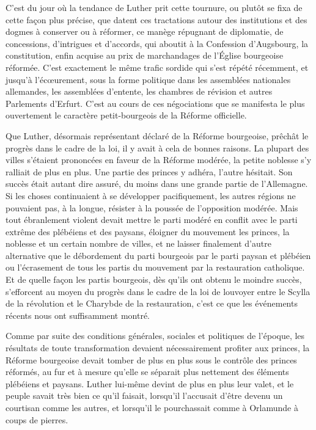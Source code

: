 \documentclass[french,twoside]{book} %
\begin{document}
\noindent C’est du jour où la tendance de Luther prit cette tournure, ou plutôt se fixa de cette façon plus précise, que datent ces tractations autour des institutions et des dogmes à conserver ou à réformer, ce manège répugnant de diplomatie, de concessions, d’intrigues et d’accords, qui aboutit à la Confession d’Augsbourg, la constitution, enfin acquise au prix de marchandages de l’Église bourgeoise réformée. C’est exactement le même trafic sordide qui s’est répété récemment, et jusqu’à l’écœurement, sous la forme politique dans les assemblées nationales allemandes, les assemblées d’entente, les chambres de révision et autres Parlements d’Erfurt. C’est au cours de ces négociations que se manifesta le plus ouvertement le caractère petit-bourgeois de la Réforme officielle.\par
Que Luther, désormais représentant déclaré de la Réforme bourgeoise, prêchât le progrès dans le cadre de la loi, il y avait à cela de bonnes raisons. La plupart des villes s’étaient prononcées en faveur de la Réforme modérée, la petite noblesse s’y ralliait de plus en plus. Une partie des princes y adhéra, l’autre hésitait. Son succès était autant dire assuré, du moins dans une grande partie de l’Allemagne. Si les choses continuaient à se développer pacifiquement, les autres régions ne pouvaient pas, à la longue, résister à la poussée de l’opposition modérée. Mais tout ébranlement violent devait mettre le parti modéré en conflit avec le parti extrême des plébéiens et des paysans, éloigner du mouvement les princes, la noblesse et un certain nombre de villes, et ne laisser finalement d’autre alternative que le débordement du parti bourgeois par le parti paysan et plébéien ou l’écrasement de tous les partis du mouvement par la restauration catholique. Et de quelle façon les partis bourgeois, dès qu’ils ont obtenu le moindre succès, s’efforcent au moyen du progrès dans le cadre de la loi de louvoyer entre le Scylla de la révolution et le Charybde de la restauration, c’est ce que les événements récents nous ont suffisamment montré.\par
Comme par suite des conditions générales, sociales et politiques de l’époque, les résultats de toute transformation devaient nécessairement profiter aux princes, la Réforme bourgeoise devait tomber de plus en plus sous le contrôle des princes réformés, au fur et à mesure qu’elle se séparait plus nettement des éléments plébéiens et paysans. Luther lui-même devint de plus en plus leur valet, et le peuple savait très bien ce qu’il faisait, lorsqu’il l’accusait d’être devenu un courtisan comme les autres, et lorsqu’il le pourchassait comme à Orlamunde à coups de pierres.\par
\end{document}
